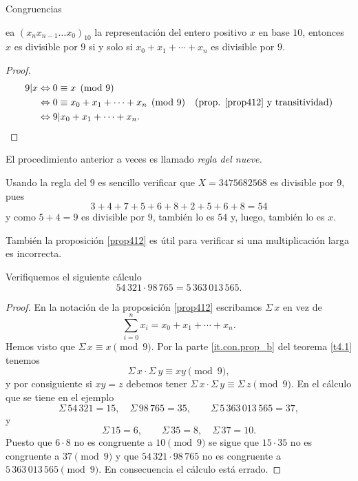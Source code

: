 \begin{section}{Congruencias}
 \begin{corolario} ea $(x_nx_{n-1}\ldots x_0)_{10}$ la representación del entero positivo $x$ en base $10$, entonces $x$ es divisible por $9$ si y solo si $ x_0+x_1+\cdots+x_n$ es divisible por $9$.
 \end{corolario}
 \begin{proof}
    \begin{align*}
        9 | x &\Leftrightarrow 0 \equiv x  \pmod{9}&& \\
        &\Leftrightarrow 0 \equiv x_0+x_1+\cdots+x_n\pmod{9}&&\text{(prop. \ref{prop412} y transitividad)} \\
        &\Leftrightarrow 9 | x_0+x_1+\cdots+x_n.
    \end{align*}
 \end{proof}
 El procedimiento anterior a veces es llamado \textit{regla del nueve.}

\begin{ejemplo*} Usando la regla del $9$  es sencillo verificar que $X= 3475682568$ es divisible por $9$, pues 
    $$
    3+4+7+5+6+8+2+5+6+8 = 54
    $$
    y como $5+4=9$ es divisible por $9$, también lo es  $54$ y, luego, también lo es $x$. 
\end{ejemplo*}

También la proposición \ref{prop412} es útil para verificar si una multiplicación larga es incorrecta. 

\begin{ejemplo*} Verifiquemos  el siguiente cálculo
$$
54\,321 \cdot 98\,765= 5\,363\,013\,565.
$$
\end{ejemplo*}
\begin{proof}
En la notación de la proposición \ref{prop412} escribamos $\Sigma\, x$ en vez de $$\sum_{i=0}^n x_i = x_0+x_1+\cdots+x_n.$$
Hemos visto que $\Sigma\, x \equiv x \pmod{9}$. Por la parte \ref{it.con.prop_b}  del
teorema \ref{t4.1} tenemos
$$
\Sigma\, x \cdot\Sigma\ y \equiv xy \pmod{9},
$$
y por consiguiente si $xy=z$ debemos tener $\Sigma\, x \cdot \Sigma\, y \equiv\Sigma\, z \pmod{9}$. 
En el cálculo que se tiene en el ejemplo
$$
\Sigma\, 54\,321=15,\quad \Sigma\, 98\,765=35,\qquad \Sigma\, 5\,363\,013\,565=37,
$$
y
$$
\Sigma\, 15=6, \qquad \Sigma\, 35=8,\quad \Sigma\, 37=10.
$$
Puesto que $6 \cdot 8$ no es congruente a $10 \pmod{9}$ se sigue
que $15 \cdot 35$ no es congruente a $37 \pmod{9}$ y que $54\,321
\cdot 98\,765$ no es congruente a $5\,363\,013\,565\pmod{9}$. En
consecuencia el cálculo está errado.
\end{proof}


\end{section}
